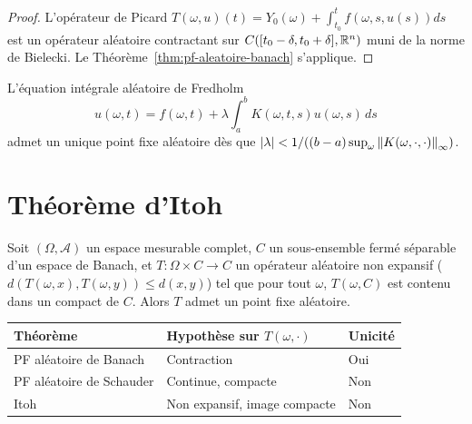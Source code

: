 \begin{proof}
L'op\'erateur de Picard $T(\omega, u)(t) = Y_0(\omega) + \int_{t_0}^t f(\omega, s, u(s)) ds$
est un op\'erateur al\'eatoire contractant sur $C([t_0-\delta, t_0+\delta], \mathbb{R}^n)$ muni
de la norme de Bielecki. Le Th\'eor\`eme~\ref{thm:pf-aleatoire-banach} s'applique.
\end{proof}

\begin{proposition}
L'\'equation int\'egrale al\'eatoire de Fredholm
\[
  u(\omega, t) = f(\omega, t) + \lambda \int_a^b K(\omega, t, s) u(\omega, s) \, ds
\]
admet un unique point fixe al\'eatoire d\`es que $\left| \lambda \right| < 1/((b-a) \sup_\omega \left\| K(\omega, \cdot, \cdot) \right\|_\infty)$.
\end{proposition}

\section{Th\'eor\`eme d'Itoh}

\begin{theoreme}[Itoh]
\label{thm:itoh}
Soit $(\Omega, \mathcal{A})$ un espace mesurable complet, $C$ un sous-ensemble ferm\'e
s\'eparable d'un espace de Banach, et $T\colon \Omega \times C \to C$ un op\'erateur
al\'eatoire non expansif ($d(T(\omega,x), T(\omega,y)) \leq d(x,y)$) tel que pour
tout $\omega$, $T(\omega, C)$ est contenu dans un compact de $C$. Alors $T$ admet
un point fixe al\'eatoire.
\end{theoreme}

\begin{formules}[title=\textbf{R\'ecapitulatif des th\'eor\`emes de points fixes al\'eatoires}]
\begin{center}
\renewcommand{\arraystretch}{1.3}
\begin{tabular}{|l|l|l|}
\hline
\textbf{Th\'eor\`eme} & \textbf{Hypoth\`ese sur $T(\omega, \cdot)$} & \textbf{Unicit\'e} \\
\hline
PF al\'eatoire de Banach & Contraction & Oui \\
PF al\'eatoire de Schauder & Continue, compacte & Non \\
Itoh & Non expansif, image compacte & Non \\
\hline
\end{tabular}
\end{center}
\end{formules}

